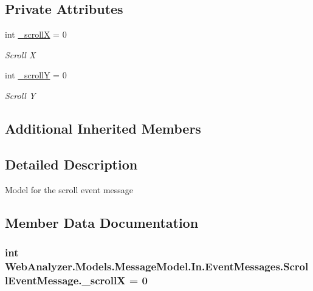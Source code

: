 \subsection*{Private Attributes}
\begin{DoxyCompactItemize}
\item 
int \hyperlink{class_web_analyzer_1_1_models_1_1_message_model_1_1_in_1_1_event_messages_1_1_scroll_event_message_ae26b23f9f8124d2315604c26b57d9514}{\+\_\+scroll\+X} = 0
\begin{DoxyCompactList}\small\item\em Scroll X \end{DoxyCompactList}\item 
int \hyperlink{class_web_analyzer_1_1_models_1_1_message_model_1_1_in_1_1_event_messages_1_1_scroll_event_message_aade3c2463574ef75166f23304ca467a1}{\+\_\+scroll\+Y} = 0
\begin{DoxyCompactList}\small\item\em Scroll Y \end{DoxyCompactList}\end{DoxyCompactItemize}
\subsection*{Additional Inherited Members}


\subsection{Detailed Description}
Model for the scroll event message 



\subsection{Member Data Documentation}
\hypertarget{class_web_analyzer_1_1_models_1_1_message_model_1_1_in_1_1_event_messages_1_1_scroll_event_message_ae26b23f9f8124d2315604c26b57d9514}{}
\subsubsection[{\+\_\+scroll\+X}]{\setlength{\rightskip}{0pt plus 5cm}int Web\+Analyzer.\+Models.\+Message\+Model.\+In.\+Event\+Messages.\+Scroll\+Event\+Message.\+\_\+scroll\+X = 0\hspace{0.3cm}{\ttfamily [private]}}\label{class_web_analyzer_1_1_models_1_1_message_model_1_1_in_1_1_event_messages_1_1_scroll_event_message_ae26b23f9f8124d2315604c26b57d9514}


